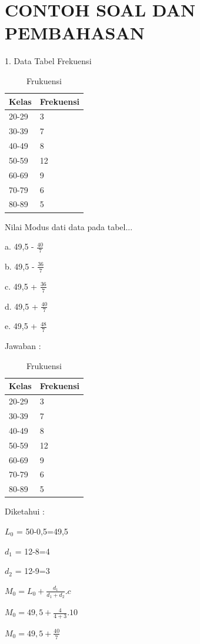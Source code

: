 \documentclass[11pt,fleqn]{book} %
\begin{document}
{\section{CONTOH SOAL DAN PEMBAHASAN}
1. Data Tabel Frekuensi
\begin{table}[h]
\centering
\begin{tabular}{l l}
\toprule
\textbf{Kelas} & \textbf{Frekuensi}\\
\midrule
20-29 & 3  \\
30-39 & 7 \\
40-49 & 8 \\
50-59 & 12 \\
60-69 & 9 \\
70-79 & 6 \\
80-89 & 5 \\
\bottomrule
\end{tabular}
\caption{Frukuensi}
\end{table}
Nilai Modus dati data pada tabel...

a. 49,5 - $ \frac{40}{7}$

b. 49,5 - $ \frac{36}{7}$

c. 49,5 + $ \frac{36}{7}$

d. 49,5 + $ \frac{40}{7}$

e. 49,5 + $ \frac{48}{7}$


Jawaban :
\begin{table}[h]
\centering
\begin{tabular}{l l}
\toprule
\textbf{Kelas} & \textbf{Frekuensi}\\
\midrule
20-29 & 3  \\
30-39 & 7 \\
40-49 & 8 \\
50-59 & 12 \\
60-69 & 9 \\
70-79 & 6 \\
80-89 & 5 \\
\bottomrule
\end{tabular}
\caption{Frukuensi}
\end{table}

Diketahui :

$L_{0}$ = 50-0,5=49,5

$d_{1}$ = 12-8=4

$d_{2}$ = 12-9=3

$M_{0} = L_{0} + \frac{d_{1}}{d_{1} + d_{2}}.c $

$M_{0} = 49,5 + \frac{4}{4 + 3}.10 $

$M_{0} = 49,5 + \frac{40}{7}$

}
\end{document}
